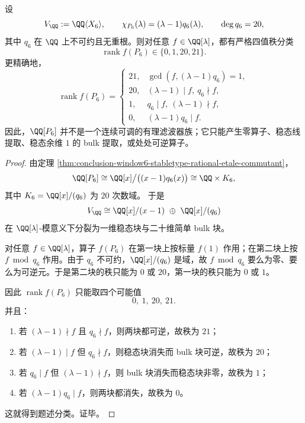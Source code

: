 \begin{theorem}\label{thm:conclusion-window6-rational-functional-calculus-four-rank}
设
\[
V_{\QQ}:=\QQ\langle X_6\rangle,
\qquad
\chi_{P_6}(\lambda)=(\lambda-1)q_6(\lambda),
\qquad
\deg q_6=20,
\]
其中 \(q_6\) 在 \(\QQ\) 上不可约且无重根。则对任意 \(f\in\QQ[\lambda]\)，都有严格四值秩分类
\[
\operatorname{rank}f(P_6)\in\{0,1,20,21\}.
\]
更精确地，
\[
\operatorname{rank}f(P_6)=
\begin{cases}
21,& \gcd(f,(\lambda-1)q_6)=1,\\[2mm]
20,& (\lambda-1)\mid f,\ q_6\nmid f,\\[2mm]
1,& q_6\mid f,\ (\lambda-1)\nmid f,\\[2mm]
0,& (\lambda-1)q_6\mid f.
\end{cases}
\]
因此，\(\QQ[P_6]\) 并不是一个连续可调的有理滤波器族；它只能产生零算子、稳态线提取、稳态余维 \(1\) 的 bulk 提取，或处处可逆算子。
\end{theorem}
\begin{proof}
由定理 \ref{thm:conclusion-window6-stabletype-rational-etale-commutant}，
\[
\QQ[P_6]\cong \QQ[x]\big/\bigl((x-1)q_6(x)\bigr)\cong \QQ\times K_6,
\]
其中 \(K_6=\QQ[x]/(q_6)\) 为 \(20\) 次数域。
于是
\[
V_{\QQ}\cong \QQ[x]/(x-1)\ \oplus\ \QQ[x]/(q_6)
\]
在 \(\QQ[\lambda]\)-模意义下分裂为一维稳态块与二十维简单 bulk 块。

对任意 \(f\in\QQ[\lambda]\)，算子 \(f(P_6)\) 在第一块上按标量 \(f(1)\) 作用；在第二块上按 \(f\bmod q_6\) 作用。由于 \(q_6\) 不可约，\(\QQ[x]/(q_6)\) 是域，故 \(f\bmod q_6\) 要么为零、要么为可逆元。于是第二块的秩只能为 \(0\) 或 \(20\)，第一块的秩只能为 \(0\) 或 \(1\)。

因此 \(\operatorname{rank}f(P_6)\) 只能取四个可能值
\[
0,\ 1,\ 20,\ 21.
\]
并且：
\begin{enumerate}
  \item 若 \((\lambda-1)\nmid f\) 且 \(q_6\nmid f\)，则两块都可逆，故秩为 \(21\)；
  \item 若 \((\lambda-1)\mid f\) 但 \(q_6\nmid f\)，则稳态块消失而 bulk 块可逆，故秩为 \(20\)；
  \item 若 \(q_6\mid f\) 但 \((\lambda-1)\nmid f\)，则 bulk 块消失而稳态块非零，故秩为 \(1\)；
  \item 若 \((\lambda-1)q_6\mid f\)，则两块都消失，故秩为 \(0\)。
\end{enumerate}
这就得到题述分类。证毕。
\end{proof}

